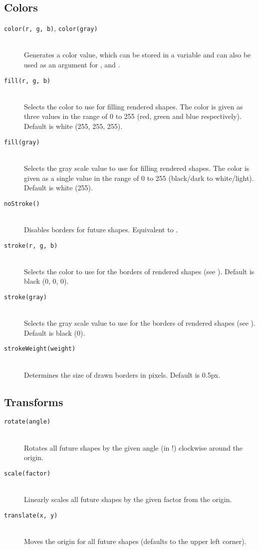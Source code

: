 \subsection{Colors}
\begin{description}
\item[\texttt{color(r, g, b)}, \texttt{color(gray)}] \hfill \\
	Generates a color value, which can be stored in a variable and can also be used as an argument for ,  and .
\item[\texttt{fill(r, g, b)}] \hfill \\
	Selects the color to use for filling rendered shapes. The color is given as three values in the range of 0 to 255 (red, green and blue respectively). Default is white (255, 255, 255).
\item[\texttt{fill(gray)}] \hfill \\
	Selects the gray scale value to use for filling rendered shapes. The color is given as a single value in the range of 0 to 255 (black/dark to white/light). Default is white (255).
\item[\texttt{noStroke()}] \hfill \\
	Disables borders for future shapes. Equivalent to .
\item[\texttt{stroke(r, g, b)}] \hfill \\
	Selects the color to use for the borders of rendered shapes (see ). Default is black (0, 0, 0).
\item[\texttt{stroke(gray)}] \hfill \\
	Selects the gray scale value to use for the borders of rendered shapes (see ). Default is black (0).
\item[\texttt{strokeWeight(weight)}] \hfill \\
	Determines the size of drawn borders in pixels. Default is 0.5px.
\end{description}

\subsection{Transforms}
\begin{description}
\item[\texttt{rotate(angle)}] \hfill \\
	Rotates all future shapes by the given angle (in !) clockwise around the origin.
\item[\texttt{scale(factor)}] \hfill \\
	Linearly scales all future shapes by the given factor from the origin.
\item[\texttt{translate(x, y)}] \hfill \\
	Moves the origin  for all future shapes (defaults to the upper left corner).
\end{description}

